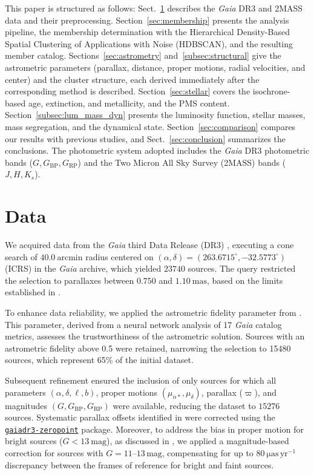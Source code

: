 \documentclass{aa}
\begin{document}
This paper is structured as follows: Sect.~\ref{sec:data} describes the \textit{Gaia} DR3 and 2MASS data and their preprocessing. Section~\ref{sec:membership} presents the analysis pipeline, the membership determination with the Hierarchical Density-Based Spatial Clustering of Applications with Noise (HDBSCAN), and the resulting member catalog. Sections~\ref{sec:astrometry} and~\ref{subsec:structural} give the astrometric parameters (parallax, distance, proper motions, radial velocities, and center) and the cluster structure, each derived immediately after the corresponding method is described. Section~\ref{sec:stellar} covers the isochrone-based age, extinction, and metallicity, and the PMS content. Section~\ref{subsec:lum_mass_dyn} presents the luminosity function, stellar masses, mass segregation, and the dynamical state. Section~\ref{sec:comparison} compares our results with previous studies, and Sect.~\ref{sec:conclusion} summarizes the conclusions. The photometric system adopted includes the \textit{Gaia} DR3 photometric bands ($G, G_{\text{BP}}, G_{\text{RP}}$) and the Two Micron All Sky Survey (2MASS) bands ($J, H, K_s$).

\section{Data}\label{sec:data}
We acquired data from the \textit{Gaia} third Data Release (DR3) \citep{2016A&A...595A...1G,2023A&A...674A...1G}, executing a cone search of $40.0~\mathrm{arcmin}$ radius centered on $(\alpha,\delta)=(263.6715^{\circ},-32.5773^{\circ})$ (ICRS) in the \textit{Gaia} archive, which yielded $23740$ sources. The query restricted the selection to parallaxes between $0.750$ and $1.10~\mathrm{mas}$, based on the limits established in \citet{2024arXiv240301030P}.

To enhance data reliability, we applied the astrometric fidelity parameter from \citet{2022MNRAS.510.2597R}. This parameter, derived from a neural network analysis of 17 \textit{Gaia} catalog metrics, assesses the trustworthiness of the astrometric solution. Sources with an astrometric fidelity above 0.5 were retained, narrowing the selection to 15480 sources, which represent 65\% of the initial dataset.

Subsequent refinement ensured the inclusion of only sources for which all parameters $(\alpha,\delta,\ell,b)$, proper motions $(\mu_{\alpha*},\mu_\delta)$, parallax ($\varpi$), and magnitudes $(G, G_\mathrm{BP}, G_\mathrm{RP})$ were available, reducing the dataset to $15276$ sources. Systematic parallax offsets identified in \citet{2021A&A...649A...4L} were corrected using the \href{https://pypi.org/project/gaiadr3-zeropoint/}{\texttt{gaiadr3-zeropoint}} package. Moreover, to address the bias in proper motion for bright sources ($G<13~\mathrm{mag}$), as discussed in \citet{2021A&A...649A.124C}, we applied a magnitude-based correction for sources with $G = 11$--$13\,\mathrm{mag}$, compensating for up to $80~\mathrm{\mu as\,yr^{-1}}$ discrepancy between the frames of reference for bright and faint sources.
\end{document}

